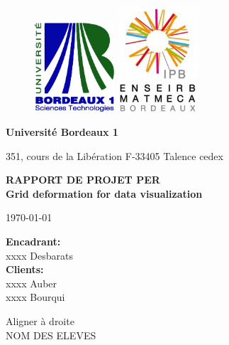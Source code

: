 \begin{titlepage}
  \begin {figure}[ht]
	\includegraphics[angle=0,width=3cm]{img/logobordeaux1.jpg}
        \hspace{10cm}
	\includegraphics[angle=0,width=3cm]{img/logo.jpg}
	\label{logo}
  \end {figure}
  \begin{flushleft}
    \textbf{Université Bordeaux 1}

    351, cours de la Libération 
    F-33405 Talence cedex 
    
  \end{flushleft}
  
  \vspace{2cm}
	\begin{center}
	  {\bf RAPPORT DE PROJET PER}\\
	  \vspace{1cm}
		 {\LARGE\bf Grid deformation for data visualization}
	\end{center}


\vspace{3cm}

{\centering \today}

\begin{flushleft}
{\bf Encadrant:}\\
xxxx  {\sc Desbarats}\\

{\bf Clients:}\\
xxxx  {\sc Auber}\\
xxxx  {\sc Bourqui}

Aligner à droite \\
NOM DES ELEVES

\end{flushleft}

\end{titlepage}
